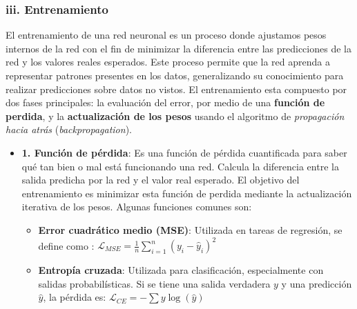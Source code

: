 \documentclass[11pt]{article} %
\begin{document}
\subsubsection{iii. Entrenamiento}
\vspace{3pt}
El entrenamiento de una red neuronal es un proceso donde ajustamos pesos internos de la red con el fin de minimizar la diferencia entre las predicciones de la red y los valores reales esperados. Este proceso permite que la red aprenda a representar patrones presentes en los datos, generalizando su conocimiento para realizar predicciones sobre datos no vistos. El entrenamiento esta compuesto por dos fases principales: la evaluación del error, por medio de una \textbf{función de perdida}, y la \textbf{actualización de los pesos} usando el algoritmo de \textit{propagación hacia atrás} (\textit{backpropagation}).
\begin{itemize}
\item\textbf{1. Función de pérdida}:\newline
Es una función de pérdida cuantificada para saber qué tan bien o mal está funcionando una red. Calcula la diferencia entre la salida predicha por la red y el valor real esperado. El objetivo del entrenamiento es minimizar esta función de perdida mediante la actualización iterativa de los pesos. \newline Algunas funciones comunes son:
\begin{itemize}
    \item \textbf{Error cuadrático medio (MSE)}: Utilizada en tareas de regresión, se define como : $\mathcal{L}_{MSE} = \frac{1}{n} \sum_{i=1}^{n}(y_i - \hat{y}_i)^2$
    \item \textbf{Entropía cruzada}: Utilizada para clasificación, especialmente con salidas probabilísticas. Si se tiene una salida verdadera $y$ y una predicción $\hat{y}$, la pérdida es: $\mathcal{L}_{CE} = -\sum y \log(\hat{y})$
\end{itemize}


\end{itemize}
\end{document}
